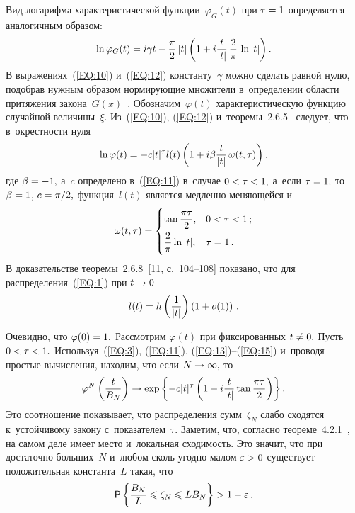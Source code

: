 \begin{multicols}{2}
Вид логарифма характеристической функции~$\varphi_G(t)$ при $\tau \hm=1$ определяется аналогичным образом:
\begin{equation}
\label{EQ:12}
\ln \varphi_G(t)=i\gamma t-\displaystyle\frac{\displaystyle \pi\mathstrut}{\displaystyle 2\mathstrut}\left\vert t\right\vert 
\left(1+i\displaystyle\frac{\displaystyle t\mathstrut}{\displaystyle |t|\mathstrut}\,\displaystyle\frac{\displaystyle 2\mathstrut}{\displaystyle \pi\mathstrut}\,\ln |t|\right).
\end{equation}
В выражениях~(\ref{EQ:10}) и~(\ref{EQ:12}) константу~$\gamma$ можно сделать равной нулю,
 подобрав нужным образом нормирующие множители в~определении области притяжения закона~$G(x)$~\cite{IL}. 
 Обозначим~$\varphi (t)$ характеристическую функцию случайной величины~$\xi.$ 
 Из~(\ref{EQ:10}), (\ref{EQ:12}) и~теоремы~2.6.5~\cite{IL} следует, что в~окрестности нуля
\begin{equation}
\label{EQ:13}
\ln \varphi(t)=-c|t|^\tau l(t)\left(1+i\beta\displaystyle\frac{\displaystyle t\mathstrut}{\displaystyle |t|\mathstrut}\,\omega (t,\tau)\right),
\end{equation}
где $\beta \hm=-1,$ а~$c$ определено в~(\ref{EQ:11}) в~случае $0\hm<\tau \hm<1,$ 
а~если $\tau \hm=1,$ то $\beta \hm=1$, $c\hm=\pi/2,$ функция~$l(t)$ является медленно меняющейся 
и
\begin{equation}
\label{14}
\omega (t,\tau)=\begin{cases}
\tan \displaystyle\frac{\displaystyle \pi \tau\mathstrut}{\displaystyle 2\mathstrut},& 0<\tau<1\,;\\
\displaystyle\frac{\displaystyle 2\mathstrut}{\displaystyle \pi\mathstrut}\ln |t|,& \tau =1\,.
\end{cases}
 \end{equation}
В доказательстве теоремы~2.6.8~[11, с.~104--108] 
показано, что для распределения~(\ref{EQ:1}) при $t\hm\rightarrow 0$
\begin{equation}
\label{EQ:15}
l(t)=h\left(\displaystyle\frac{\displaystyle 1\mathstrut}{\displaystyle |t|\mathstrut}\right)\left(1+o(1)\right)\,.
\end{equation}

Очевидно, что $\varphi (0)\hm=1.$ Рассмотрим $\varphi (t)$ при фиксированных $t\hm\neq 0.$ 
Пусть $0\hm<\tau \hm<1.$ Используя~(\ref{EQ:3}), (\ref{EQ:11}), (\ref{EQ:13})--(\ref{EQ:15}) 
и~проводя простые вычисления, находим, что если $N\hm\rightarrow \infty,$ то
$$
\varphi^N\left(\displaystyle\frac{\displaystyle t\mathstrut}{\displaystyle B_N\mathstrut}\right) \rightarrow 
\exp \left\{-c|t|^\tau \left(1-i\displaystyle\frac{\displaystyle t\mathstrut}{\displaystyle |t|\mathstrut}\tan \displaystyle\frac{\displaystyle \pi \tau\mathstrut}{\displaystyle 2\mathstrut}\right)\right\}.
$$
Это соотношение показывает, что распределения сумм~$\zeta_N$ слабо сходятся к~устойчивому 
закону с~показателем~$\tau.$ Заметим, что, согласно теореме~4.2.1~\cite{IL}, 
на самом деле имеет место и~локальная сходимость. Это значит, что при достаточно больших~$N$ 
и~любом сколь угодно малом $\varepsilon \hm>0$ существует положительная константа~$L$ такая, что
\begin{equation}
\label{EQ:16}
\mathsf{P}\left\{\displaystyle\frac{\displaystyle B_N\mathstrut}{\displaystyle L\mathstrut}\leqslant \zeta_N \leqslant LB_N\right \}>1-\varepsilon\,.
\end{equation}


\end{multicols}
